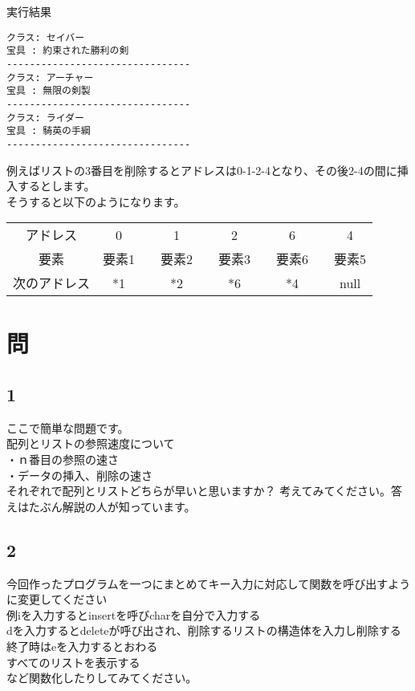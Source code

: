 
\begin{itembox}{実行結果}
\begin{verbatim}
クラス: セイバー
宝具 : 約束された勝利の剣
--------------------------------
クラス: アーチャー
宝具 : 無限の剣製
--------------------------------
クラス: ライダー
宝具 : 騎英の手綱
--------------------------------
\end{verbatim}
\end{itembox}
例えばリストの3番目を削除するとアドレスは0-1-2-4となり、その後2-4の間に挿入するとします。\\
そうすると以下のようになります。
\begin{table}[htb]
\begin{center}
\begin{tabular}{|c|c|c|c|c|c|c|c|c|c|}
\cline{1-1}\cline{2-2}\cline{4-4}\cline{6-6}\cline{8-8}\cline{10-10}
アドレス & 0 && 1 && 2 && 6 && 4 \\ \cline{1-1}\cline{2-2}\cline{4-4}\cline{6-6}\cline{8-8}\cline{10-10}
要素 & 要素1 && 要素2 && 要素3 && 要素6 && 要素5\\ \cline{1-1}\cline{2-2}\cline{4-4}\cline{6-6}\cline{8-8}\cline{10-10}
次のアドレス & *1 && *2 && *6 && *4 && null   \\ 
\cline{1-1}\cline{2-2}\cline{4-4}\cline{6-6}\cline{8-8}\cline{10-10}
\end{tabular}
\end{center}
\end{table}

\section{問}
\subsection{1}
ここで簡単な問題です。\\
配列とリストの参照速度について\\
・ｎ番目の参照の速さ\\
・データの挿入、削除の速さ\\
それぞれで配列とリストどちらが早いと思いますか？
考えてみてください。答えはたぶん解説の人が知っています。

\subsection{2}
今回作ったプログラムを一つにまとめてキー入力に対応して関数を呼び出すように変更してください\\
例iを入力するとinsertを呼びcharを自分で入力する\\
dを入力するとdeleteが呼び出され、削除するリストの構造体を入力し削除する\\
終了時はeを入力するとおわる\\
すべてのリストを表示する\\
など関数化したりしてみてください。

